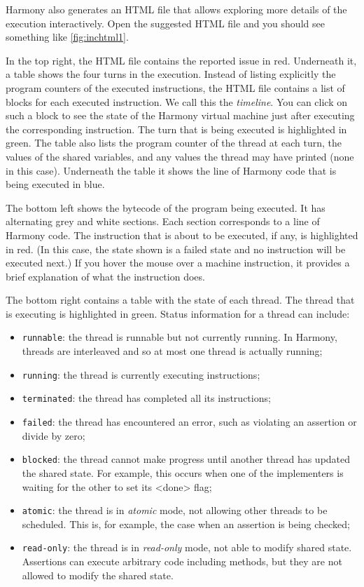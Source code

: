 \documentclass{report}
\begin{document}
Harmony also generates an HTML file that allows exploring more details
of the execution interactively.
Open the suggested HTML file and you should see something like
\autoref{fig:inchtml1}.

In the top right, the HTML file contains the reported issue in red.
Underneath it, a table shows the four turns in the execution.
Instead of listing explicitly the program counters of the executed
instructions, the HTML file contains a list of blocks for each
executed instruction.  We call this the \emph{timeline}.
You can click on such a block to see the state of the Harmony
virtual machine just after executing the corresponding instruction.
The turn that is being executed is highlighted in green.
The table also lists the program counter of the thread at each turn,
the values of the shared variables, and any values the thread
may have printed (none in this case).
%
Underneath the table it shows the line of Harmony code that is being
executed in blue.

The bottom left shows
the bytecode of the program being executed.  It has alternating
grey and white sections.  Each section corresponds to a line of
Harmony code.  The instruction that is about to be executed,
if any, is highlighted in red.  (In this case, the state shown
is a failed state and no instruction will be executed next.)
If you hover the mouse over a machine instruction, it provides a
brief explanation of what the instruction does.

The bottom right contains a table with the state of each thread.
The thread that is executing is highlighted in green.
Status information for a thread can include:
\begin{itemize}
\item[] \texttt{runnable}: the thread is runnable but not
currently running.  In Harmony, threads are interleaved and so
at most one thread is actually running;
\item[] \texttt{running}: the thread is currently executing
instructions;
\item[] \texttt{terminated}: the thread has completed all its
instructions;
\item[] \texttt{failed}: the thread has encountered an error,
such as violating an assertion or divide by zero;
\item[] \texttt{blocked}: the thread cannot make progress until
another thread has updated the shared state.  For example, this
occurs when one of the implementers is waiting for the other
to set its <{done}> flag;
\item[] \texttt{atomic}: the thread is in \emph{atomic} mode,
not allowing other threads to be scheduled.  This is, for example,
the case when an assertion is being checked;
\item[] \texttt{read-only}: the thread is in \emph{read-only} mode,
not able to modify shared state.  Assertions can execute
arbitrary code including methods, but they are not allowed to
modify the shared state.
\end{itemize}
\end{document}
